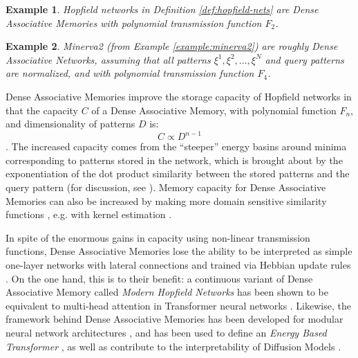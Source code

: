 \documentclass{article}
\newtheorem{example}{Example}[subsection]
\theoremstyle{definition}
\begin{document}
\begin{example}
  Hopfield networks in Definition \ref{def:hopfield-nets} are Dense
  Associative Memories
  with polynomial transmission function $F_2$.
\end{example}

\begin{example}
  Minerva2 (from Example \ref{example:minerva2}) are roughly Dense
  Associative Networks,
  assuming that all patterns $\xi^1, \xi^2, \dots, \xi^N$ and query
  patterns are normalized,
  and with polynomial transmission function $F_4$.
\end{example}

Dense Associative Memories improve the storage capacity of Hopfield networks
in that the capacity $C$ of a Dense Associative Memory, with
polynomial function $F_n$,
and dimensionality of patterns $D$ is:
\begin{equation}
  C \propto D^{n-1}
\end{equation}
\parencites{krotov_dense_2016,demircigil_model_2017,bao_capacity_2022}.
The increased capacity comes from the ``steeper'' energy basins
around minima corresponding to patterns stored in the network, which
is brought about by the exponentiation of the dot product similarity
between the stored patterns and the query pattern (for discussion, see
\textcite{kelly_memory_2017}). Memory capacity for Dense Associative
Memories can also be increased by making more domain sensitive
similarity functions \parencite{millidge_universal_2022},
e.g. with kernel estimation \parencite{hu_provably_2024,wu_uniform_2024}.

In spite of the enormous gains in capacity using non-linear
transmission functions, Dense Associative Memories lose the ability
to be interpreted as simple one-layer networks with lateral connections
and trained via Hebbian update rules
\parencites{krotov_large_2021,mcalister_sequential_2025}.
On the one hand, this is to their benefit: a continuous variant of
Dense Associative
Memory called \textit{Modern Hopfield Networks} has been shown to be
equivalent to multi-head attention in Transformer neural networks
\parencites{ramsauer_hopfield_2021,vaswani_attention_2023}. Likewise,
the framework behind Dense Associative Memories has been developed for
modular neural network architectures \parencite{krotov_hierarchical_2021},
and has been used to define an \textit{Energy Based Transformer}
\parencite{hoover_energy_2023}, as well as contribute to the interpretability
of Diffusion Models \parencite{pham_memorization_2025}.
\end{document}
